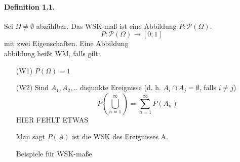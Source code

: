 \documentclass[10pt,a4paper,titlepage]{book}
\begin{document}
\paragraph{Definition 1.1.}  Sei $\Omega \neq \emptyset$ abzählbar. Das WSK-maß ist eine Abbildung $P:\mathcal{P}(\Omega)$.
$$P: \mathcal{P}(\Omega) \rightarrow [0;1]$$
mit zwei Eigenschaften.
Eine Abbildung \\abbildung heißt WM, falls gilt:
\begin{itemize}
\item[(W1)] $P(\Omega) = 1$
\item[(W2)] Sind $A_1, A_2, ..$ disjunkte Ereignisse (d. h. $A_i \cap A_j = \emptyset$, falls $i \neq j$)
$$P\left(\bigcup_{n=1}^\infty\right)  = \sum_{n =1}^\infty P(A_n)$$ HIER FEHLT ETWAS

Man sagt $P(A)$ ist die WSK des Ereignisses A.

Beispiele für WSK-maße

\end{itemize}
\end{document}
